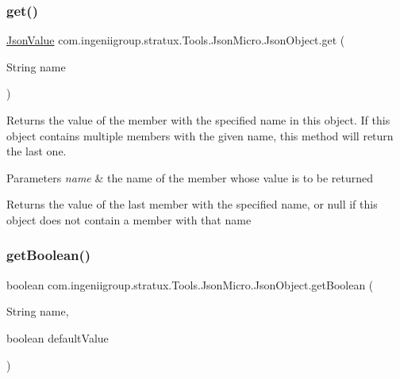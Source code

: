 \mbox{\label{classcom_1_1ingeniigroup_1_1stratux_1_1_tools_1_1_json_micro_1_1_json_object_a5648ce3abe042b1a434664470bedc756}} 
\subsubsection{\texorpdfstring{get()}{get()}}
{\footnotesize\ttfamily \hyperlink{classcom_1_1ingeniigroup_1_1stratux_1_1_tools_1_1_json_micro_1_1_json_value}{Json\+Value} com.\+ingeniigroup.\+stratux.\+Tools.\+Json\+Micro.\+Json\+Object.\+get (\begin{DoxyParamCaption}\item[{String}]{name }\end{DoxyParamCaption})}

Returns the value of the member with the specified name in this object. If this object contains multiple members with the given name, this method will return the last one.


\begin{DoxyParams}{Parameters}
{\em name} & the name of the member whose value is to be returned \\
\hline
\end{DoxyParams}
\begin{DoxyReturn}{Returns}
the value of the last member with the specified name, or {\ttfamily null} if this object does not contain a member with that name 
\end{DoxyReturn}
\mbox{\label{classcom_1_1ingeniigroup_1_1stratux_1_1_tools_1_1_json_micro_1_1_json_object_a3f2a04af4d046b3b045aa46b2118b701}} 
\subsubsection{\texorpdfstring{get\+Boolean()}{getBoolean()}}
{\footnotesize\ttfamily boolean com.\+ingeniigroup.\+stratux.\+Tools.\+Json\+Micro.\+Json\+Object.\+get\+Boolean (\begin{DoxyParamCaption}\item[{String}]{name,  }\item[{boolean}]{default\+Value }\end{DoxyParamCaption})}

